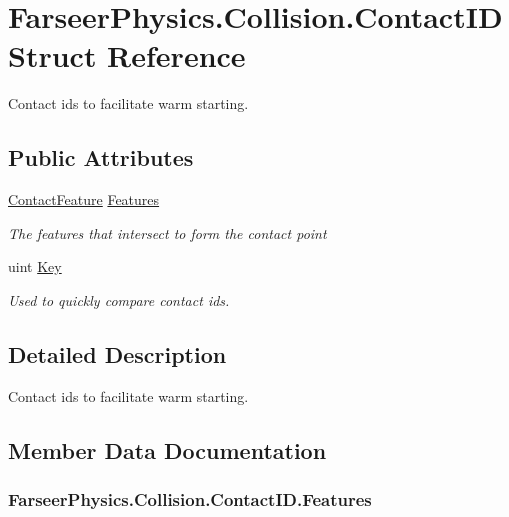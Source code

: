 \hypertarget{struct_farseer_physics_1_1_collision_1_1_contact_i_d}{\section{Farseer\+Physics.\+Collision.\+Contact\+I\+D Struct Reference}
\label{struct_farseer_physics_1_1_collision_1_1_contact_i_d}
}


Contact ids to facilitate warm starting.  


\subsection*{Public Attributes}
\begin{DoxyCompactItemize}
\item 
\hyperlink{struct_farseer_physics_1_1_collision_1_1_contact_feature}{Contact\+Feature} \hyperlink{struct_farseer_physics_1_1_collision_1_1_contact_i_d_a5df0b48fa655e4efbb117d2db037ab6f}{Features}
\begin{DoxyCompactList}\small\item\em The features that intersect to form the contact point \end{DoxyCompactList}\item 
uint \hyperlink{struct_farseer_physics_1_1_collision_1_1_contact_i_d_a6c7336008845a65bdaa5b73e95b9d456}{Key}
\begin{DoxyCompactList}\small\item\em Used to quickly compare contact ids. \end{DoxyCompactList}\end{DoxyCompactItemize}


\subsection{Detailed Description}
Contact ids to facilitate warm starting. 



\subsection{Member Data Documentation}
\hypertarget{struct_farseer_physics_1_1_collision_1_1_contact_i_d_a5df0b48fa655e4efbb117d2db037ab6f}{
\subsubsection[{Features}]{ Farseer\+Physics.\+Collision.\+Contact\+I\+D.\+Features}}\label{struct_farseer_physics_1_1_collision_1_1_contact_i_d_a5df0b48fa655e4efbb117d2db037ab6f}


